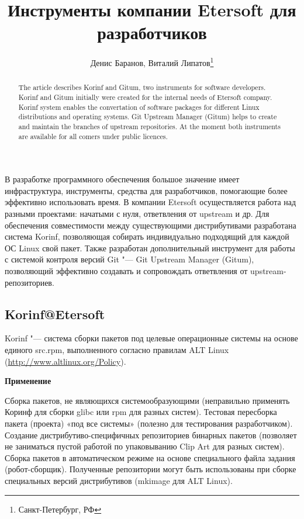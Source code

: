 \documentclass[10pt, a5paper]{article}
\begin{document}
\title{Инструменты компании Etersoft для разработчиков}%

\author{Денис Баранов, Виталий Липатов\footnote{Санкт-Петербург, РФ}}
\maketitle

\begin{abstract}
The article describes Korinf and Gitum, two instruments for software developers. Korinf and Gitum initially were created for the internal needs of Etersoft company. Korinf system enables the convertation of software packages for different Linux distributions and operating systems. Git Upstream Manager (Gitum) helps to create and maintain the branches of upstream repositories. At the moment both instruments are available for all comers under public licences.
\end{abstract}

В разработке программного обеспечения большое значение имеет инфраструктура, инструменты, средства для разработчиков, помогающие более эффективно использовать время. В компании \linebreak Etersoft осуществляется работа над разными проектами: начатыми с нуля, ответвления от upstream и др. Для обеспечения совместимости между существующими дистрибутивами разработана система Korinf, позволяющая собирать индивидуально подходящий для каждой ОС Linux свой пакет. Также разработан дополнительный инструмент для работы с системой контроля версий Git "--- Git Upstream Manager (Gitum), позволяющий эффективно создавать и сопровождать ответвления от upstream-репозиториев.

\subsection*{Korinf@Etersoft}

Korinf "--- система сборки пакетов под целевые операционные системы на основе единого src.rpm, выполненного согласно правилам ALT Linux (\url{http://www.altlinux.org/Policy}).

\textbf{Применение}

	Сборка пакетов, не являющихся системообразующими (неправильно применять Коринф для сборки glibc или rpm для разных систем). 
	Тестовая пересборка пакета (проекта) «под все системы» (полезно для тестирования разработчиком). 
	Создание дистрибутиво-специфичных репозиториев бинарных пакетов (позволяет не заниматься пустой работой по упаковыванию Clip Art для разных систем). 
	Сборка пакетов в автоматическом режиме на основе специального файла задания (робот-сборщик). 
	Полученные репозитории могут быть использованы при сборке специальных версий дистрибутивов (mkimage для ALT Linux).
\end{document}
